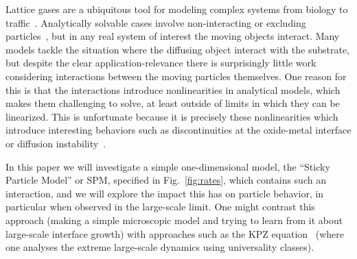 \documentclass[
reprint,
 amsmath,amssymb,
 aps,
 prl,
]{revtex4-1}
\begin{document}
Lattice gases are a ubiquitous tool for modeling complex systems from biology to traffic~\cite{1742-5468-2011-07-P07007, Mobilia2007, tegner2015high, zhu2012atomic, DealGrove1965, MottCabrera1949, Buzzaccaro2007}. 
Analytically solvable cases involve non-interacting or excluding particles~\cite{ladd1988application, liggett1985interacting, BenNaim1999}, but in any real system of interest the moving objects interact. Many models tackle the situation where the diffusing
object interact with the substrate,
but despite the clear application-relevance there is surprisingly little work considering interactions between the moving particles themselves.  One reason for this is that the interactions introduce nonlinearities in analytical models, which makes them
challenging to solve, at least outside of limits in which they can be linearized. This is unfortunate because it is precisely these nonlinearities which introduce interesting behaviors such as discontinuities at the oxide-metal interface or
diffusion instability~\cite{Obukhovsky2017, Gorokhova2010}.

In this paper we will
investigate a simple one-dimensional model, the ``Sticky Particle Model'' or SPM, specified in Fig.~\ref{fig:rates}, which contains such an interaction, and we will explore the impact this has on particle behavior, in particular
when observed in the large-scale limit.
One might contrast
this approach (making a simple microscopic model and trying to learn from it about large-scale interface growth) with approaches such as the KPZ equation~\cite{PhysRevLett.56.889, PhysRevA.38.4271, Sasamoto2010} (where one analyses the extreme
large-scale dynamics using universality classes).
\end{document}
